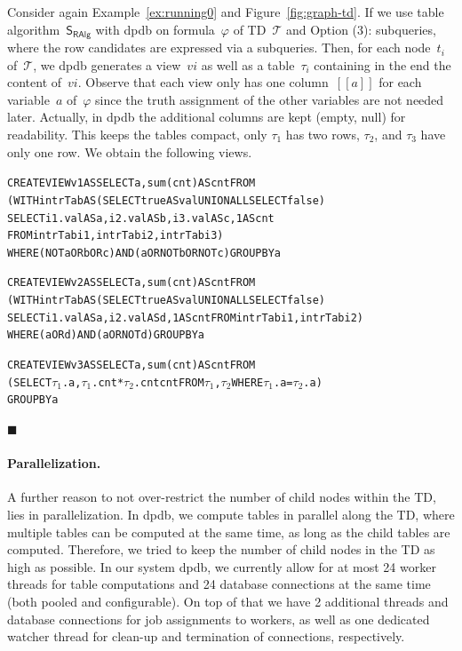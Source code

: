 \documentclass{llncs}
\newcommand{\cid}[1]{\ensuremath{[\![#1]\!]}}
\newcommand{\dpdb}{{\small\textsf{dpdb}}\xspace}
\newcommand{\tab}[1]{\ensuremath{\tau_{#1}}}
\renewenvironment{example}{\begin{EXa}}{\hfill\ensuremath{\blacksquare}\end{EXa}}
\begin{document}
\begin{example}\label{ex:dbviews}
Consider again Example~\ref{ex:running0} and Figure~\ref{fig:graph-td}.
If we use table algorithm~$\mathsf{S_{RAlg}}$ with \dpdb on formula~$\varphi$ of TD~$\mathcal{T}$ and Option (3): subqueries, where the row candidates are expressed via a subqueries. Then, for each node~$t_i$ of~$\mathcal{T}$, we \dpdb generates a view~$vi$ 
as well as a table~$\tab{i}$ containing in the end the content of~$vi$.
Observe that each view only has one column~$\cid{a}$ for each variable~$a$ of~$\varphi$ since the
truth assignment of the other variables are not needed later.
Actually, in \dpdb the additional columns are kept (empty, null) for readability.
This keeps the tables compact, only $\tab{1}$ has two rows, $\tab{2}$, and $\tab{3}$ have only one row.
We obtain the following views.
%
\begin{alltt}\small
CREATE VIEW v1 AS SELECT a, sum(cnt) AS cnt FROM 
 (WITH intrTab AS (SELECT true AS val UNION ALL SELECT false)
   SELECT i1.val AS a, i2.val AS b, i3.val AS c, 1 AS cnt 
          FROM intrTab i1, intrTab i2, intrTab i3)  
WHERE (NOT a OR b OR c) AND (a OR NOT b OR NOT c) GROUP BY a

CREATE VIEW v2 AS SELECT a, sum(cnt) AS cnt FROM 
 (WITH intrTab AS (SELECT true AS val UNION ALL SELECT false) 
   SELECT i1.val AS a, i2.val AS d, 1 AS cnt FROM intrTab i1, intrTab i2) 
WHERE (a OR d) AND (a OR NOT d) GROUP BY a

CREATE VIEW v3 AS SELECT a, sum(cnt) AS cnt FROM 
 (SELECT \ensuremath{\tab{1}}.a, \ensuremath{\tab{1}}.cnt * \ensuremath{\tab{2}}.cnt cnt FROM \ensuremath{\tab{1}}, \ensuremath{\tab{2}} WHERE \ensuremath{\tab{1}}.a = \ensuremath{\tab{2}}.a)
GROUP BY a\end{alltt}%
\vspace{-2em}
\end{example}%


\paragraph*{Parallelization.} A further reason to not over-restrict the number of child nodes within the TD, lies in parallelization.
In \dpdb, we compute tables in parallel along the TD,
where multiple tables can be computed at the same time,
as long as the child tables are computed.
Therefore, we tried to keep the number of child nodes in the TD as high as possible.
In our system \dpdb, we currently allow 
for at most 24 worker threads for table computations and 24 database connections at the same time (both pooled and configurable).
On top of that we have 2 additional threads and database connections for job assignments to workers, as well as one dedicated watcher thread for clean-up and termination of connections, respectively.
\end{document}
